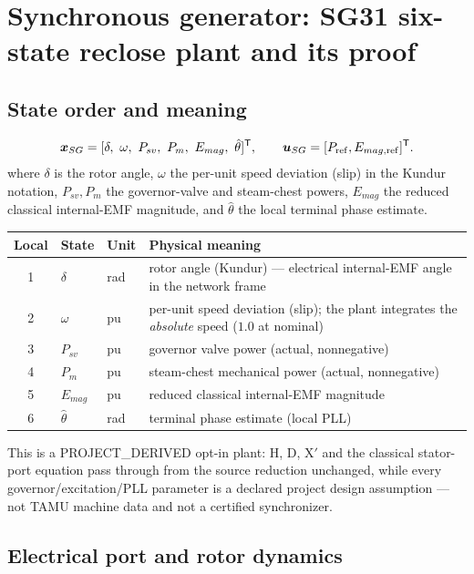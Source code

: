\documentclass[12pt,a4paper]{article}
\newcommand{\vect}[1]{\boldsymbol{#1}}
\begin{document}
\section{Synchronous generator: SG31 six-state reclose plant and its proof}

\subsection{State order and meaning}

\[
\vect x_{SG}=[\delta,\ \omega,\ P_{sv},\ P_m,\ E_{mag},\ \hat\theta]^{\mathsf T},
\qquad \vect u_{SG}=[P_{\rm ref},E_{mag,\rm ref}]^{\mathsf T}.
\]
where $\delta$ is the rotor angle, $\omega$ the per-unit speed deviation (slip)
in the Kundur notation, $P_{sv},P_m$ the governor-valve and steam-chest powers,
$E_{mag}$ the reduced classical internal-EMF magnitude, and $\hat\theta$ the
local terminal phase estimate.
\begin{center}\footnotesize
\begin{tabularx}{\textwidth}{c l l X}
\toprule
Local & State & Unit & Physical meaning\\\midrule
1 & $\delta$ & rad & rotor angle (Kundur) --- electrical internal-EMF angle in the network frame\\
2 & $\omega$ & pu & per-unit speed deviation (slip); the plant integrates the \emph{absolute} speed ($1.0$ at nominal)\\
3 & $P_{sv}$ & pu & governor valve power (actual, nonnegative)\\
4 & $P_m$ & pu & steam-chest mechanical power (actual, nonnegative)\\
5 & $E_{mag}$ & pu & reduced classical internal-EMF magnitude\\
6 & $\hat\theta$ & rad & terminal phase estimate (local PLL)\\
\bottomrule
\end{tabularx}
\end{center}
This is a PROJECT\_DERIVED opt-in plant: H, D, X$'$ and the classical
stator-port equation pass through from the source reduction unchanged, while
every governor/excitation/PLL parameter is a declared project design
assumption --- not TAMU machine data and not a certified synchronizer.

\subsection{Electrical port and rotor dynamics}
\end{document}

